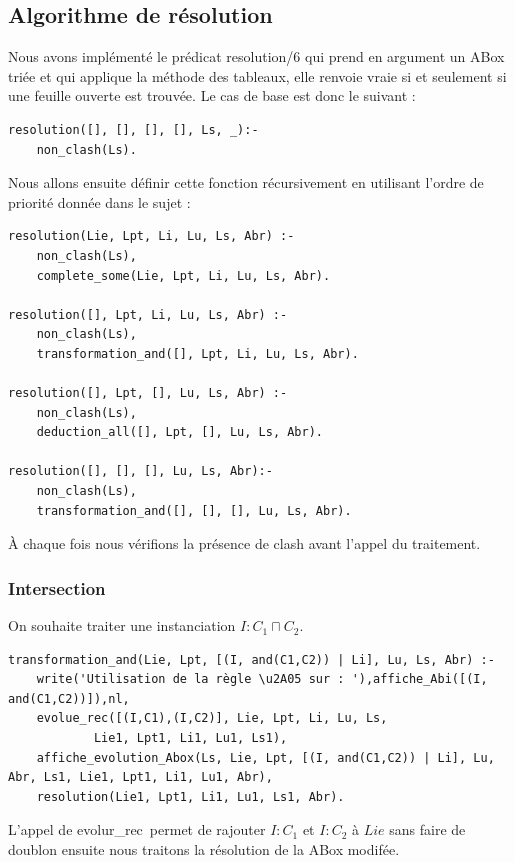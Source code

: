 \documentclass{article}
\begin{document}
\subsection{Algorithme de résolution}
Nous avons implémenté le prédicat resolution/6 qui prend en argument un ABox triée et qui applique la méthode des tableaux, elle renvoie vraie si et seulement si une feuille ouverte est trouvée. Le cas de base est donc le suivant :
\begin{verbatim}
resolution([], [], [], [], Ls, _):-
	non_clash(Ls).
\end{verbatim}

Nous allons ensuite définir cette fonction récursivement en utilisant l'ordre de priorité donnée dans le sujet :
\begin{verbatim}
resolution(Lie, Lpt, Li, Lu, Ls, Abr) :-
    non_clash(Ls),
    complete_some(Lie, Lpt, Li, Lu, Ls, Abr).
	
resolution([], Lpt, Li, Lu, Ls, Abr) :-
    non_clash(Ls),
    transformation_and([], Lpt, Li, Lu, Ls, Abr).
	
resolution([], Lpt, [], Lu, Ls, Abr) :-
    non_clash(Ls),
    deduction_all([], Lpt, [], Lu, Ls, Abr).
	
resolution([], [], [], Lu, Ls, Abr):-
	non_clash(Ls),
	transformation_and([], [], [], Lu, Ls, Abr).
\end{verbatim}

À chaque fois nous vérifions la présence de clash avant l'appel du traitement.

\subsubsection{Intersection}
On souhaite traiter une instanciation $I:C_1\sqcap C_2$.
\begin{verbatim}
transformation_and(Lie, Lpt, [(I, and(C1,C2)) | Li], Lu, Ls, Abr) :- 
	write('Utilisation de la règle \u2A05 sur : '),affiche_Abi([(I, and(C1,C2))]),nl,
	evolue_rec([(I,C1),(I,C2)], Lie, Lpt, Li, Lu, Ls,
            Lie1, Lpt1, Li1, Lu1, Ls1),
	affiche_evolution_Abox(Ls, Lie, Lpt, [(I, and(C1,C2)) | Li], Lu, Abr, Ls1, Lie1, Lpt1, Li1, Lu1, Abr),
	resolution(Lie1, Lpt1, Li1, Lu1, Ls1, Abr).
\end{verbatim}

L'appel de \color{blue}evolur\_rec\color{black}\ permet de rajouter $I:C_1$ et $I:C_2$ à $Lie$ sans faire de doublon ensuite nous traitons la résolution de la ABox modifée.
\end{document}
